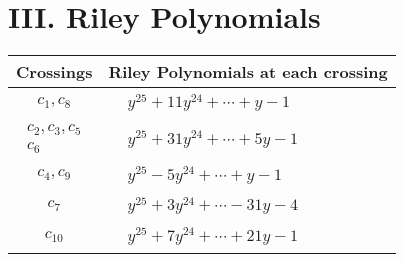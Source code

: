 \documentclass[1p]{elsarticle_modified}
\theoremstyle{definition}
\begin{document}
\centering \section*{ III. Riley Polynomials}
\begin{tabular}{m{50pt}|m{274pt}}
Crossings & \hspace{64pt}Riley Polynomials at each crossing \\
\hline $$\begin{aligned}c_{1},c_{8}\end{aligned}$$&$\begin{aligned}
&y^{25}+11 y^{24}+\cdots+y-1
\end{aligned}$\\
\hline $$\begin{aligned}c_{2},c_{3},c_{5}\\c_{6}\end{aligned}$$&$\begin{aligned}
&y^{25}+31 y^{24}+\cdots+5 y-1
\end{aligned}$\\
\hline $$\begin{aligned}c_{4},c_{9}\end{aligned}$$&$\begin{aligned}
&y^{25}-5 y^{24}+\cdots+y-1
\end{aligned}$\\
\hline $$\begin{aligned}c_{7}\end{aligned}$$&$\begin{aligned}
&y^{25}+3 y^{24}+\cdots-31 y-4
\end{aligned}$\\
\hline $$\begin{aligned}c_{10}\end{aligned}$$&$\begin{aligned}
&y^{25}+7 y^{24}+\cdots+21 y-1
\end{aligned}$\\
\hline
\end{tabular}
\vskip 2pc
\end{document}

